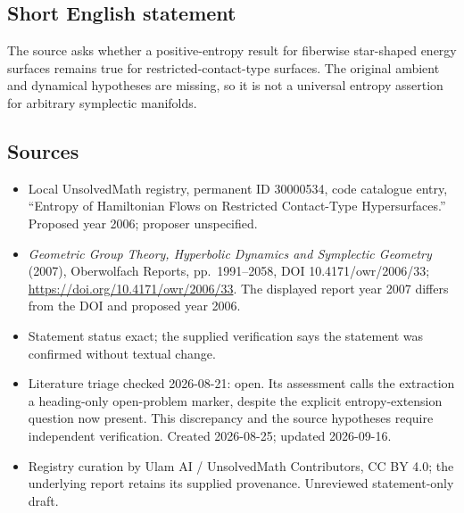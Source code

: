 \documentclass[11pt]{article}
\begin{document}
\subsection{Short English statement}
The source asks whether a positive-entropy result for fiberwise star-shaped energy surfaces remains true for restricted-contact-type surfaces. The original ambient and dynamical hypotheses are missing, so it is not a universal entropy assertion for arbitrary symplectic manifolds.
\subsection{Sources}
\begin{itemize}
\item Local UnsolvedMath registry, permanent ID 30000534, code catalogue entry, ``Entropy of Hamiltonian Flows on Restricted Contact-Type Hypersurfaces.'' Proposed year 2006; proposer unspecified.
\item \emph{Geometric Group Theory, Hyperbolic Dynamics and Symplectic Geometry} (2007), Oberwolfach Reports, pp.\ 1991--2058, DOI 10.4171/owr/2006/33; \url{https://doi.org/10.4171/owr/2006/33}. The displayed report year 2007 differs from the DOI and proposed year 2006.
\item Statement status exact; the supplied verification says the statement was confirmed without textual change.
\item Literature triage checked 2026-08-21: open. Its assessment calls the extraction a heading-only open-problem marker, despite the explicit entropy-extension question now present. This discrepancy and the source hypotheses require independent verification. Created 2026-08-25; updated 2026-09-16.
\item Registry curation by Ulam AI / UnsolvedMath Contributors, CC BY 4.0; the underlying report retains its supplied provenance. Unreviewed statement-only draft.
\end{itemize}
\end{document}
